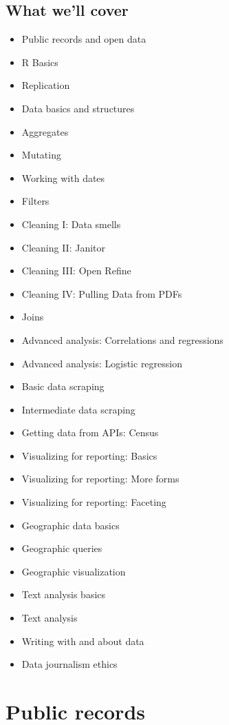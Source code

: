 \documentclass[]{book}
\providecommand{\tightlist}{%
  \setlength{\itemsep}{0pt}\setlength{\parskip}{0pt}}
\begin{document}
\hypertarget{what-well-cover}{%
\section{What we'll cover}\label{what-well-cover}}

\begin{itemize}
\tightlist
\item
  Public records and open data
\item
  R Basics
\item
  Replication
\item
  Data basics and structures
\item
  Aggregates
\item
  Mutating
\item
  Working with dates
\item
  Filters
\item
  Cleaning I: Data smells
\item
  Cleaning II: Janitor
\item
  Cleaning III: Open Refine
\item
  Cleaning IV: Pulling Data from PDFs
\item
  Joins
\item
  Advanced analysis: Correlations and regressions
\item
  Advanced analysis: Logistic regression
\item
  Basic data scraping
\item
  Intermediate data scraping
\item
  Getting data from APIs: Census
\item
  Visualizing for reporting: Basics
\item
  Visualizing for reporting: More forms
\item
  Visualizing for reporting: Faceting
\item
  Geographic data basics
\item
  Geographic queries
\item
  Geographic visualization
\item
  Text analysis basics
\item
  Text analysis
\item
  Writing with and about data
\item
  Data journalism ethics
\end{itemize}

\hypertarget{public-records}{%
\chapter{Public records}\label{public-records}}
\end{document}
